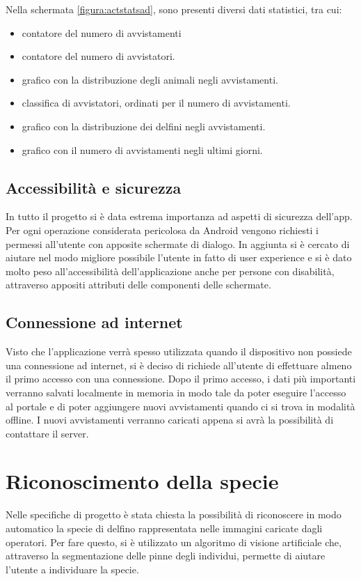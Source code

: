 \documentclass[a4paper,final,12pt]{report}
\begin{document}
Nella schermata \ref{figura:actstatsad}, sono presenti diversi dati statistici, tra cui:
\begin{itemize}
    \item contatore del numero di avvistamenti
    \item contatore del numero di avvistatori.
    \item grafico con la distribuzione degli animali negli avvistamenti.
    \item classifica di avvistatori, ordinati per il numero di avvistamenti.
    \item grafico con la distribuzione dei delfini negli avvistamenti.
    \item grafico con il numero di avvistamenti negli ultimi giorni.
\end{itemize}

\section{Accessibilità e sicurezza}
In tutto il progetto si è data estrema importanza ad aspetti di sicurezza dell'app. Per ogni operazione considerata pericolosa da Android vengono richiesti i permessi all'utente con apposite schermate di dialogo. In aggiunta si è cercato di aiutare nel modo migliore possibile l'utente in fatto di user experience e si è dato molto peso all'accessibilità dell'applicazione anche per persone con disabilità, attraverso appositi attributi delle componenti delle schermate.

\section{Connessione ad internet}
Visto che l'applicazione verrà spesso utilizzata quando il dispositivo non possiede una connessione ad internet, si è deciso di richiede all'utente di effettuare almeno il primo accesso con una connessione. Dopo il primo accesso, i dati più importanti verranno salvati localmente in memoria in modo tale da poter eseguire l'accesso al portale e di poter aggiungere nuovi avvistamenti quando ci si trova in modalità offline. I nuovi avvistamenti verranno caricati appena si avrà la possibilità di contattare il server.


\chapter{Riconoscimento della specie}
Nelle specifiche di progetto è stata chiesta la possibilità di riconoscere in modo automatico la specie di delfino rappresentata nelle immagini caricate dagli operatori. Per fare questo, si è utilizzato un algoritmo di visione artificiale che, attraverso la segmentazione delle pinne degli individui, permette di aiutare l'utente a individuare la specie.
\end{document}
